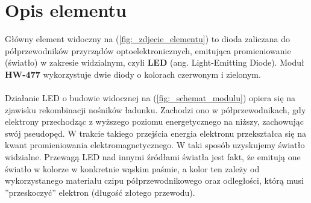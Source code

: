 \documentclass[11pt, a4paper]{article}
\author{Dawid Sobczak}
\begin{document}
%
%
\newpage

\section*{Opis elementu}
Główny element widoczny na (\ref{fig:_zdjecie_elementu}) to dioda zaliczana do półprzewodników przyrządów optoelektronicznych, emitująca promieniowanie (światło) w zakresie widzialnym, czyli \textbf{LED} (ang. Light-Emitting Diode). Moduł \textbf{HW-477} wykorzystuje dwie diody o kolorach czerwonym i zielonym.\\\\

Działanie LED o budowie widocznej na (\ref{fig:_schemat_modulu}) opiera się na zjawisku rekombinacji nośników ładunku. Zachodzi ono w półprzewodnikach, gdy elektrony przechodząc z wyższego poziomu energetycznego na niższy, zachowując swój pseudopęd. W trakcie takiego przejścia energia elektronu przekształca się na kwant promieniowania elektromagnetycznego. W taki sposób uzyskujemy światło widzialne.
Przewagą LED nad innymi źródłami światła jest fakt, że emitują one światło w kolorze w konkretnie wąskim paśmie, a kolor ten zależy od wykorzystanego materiału czipu półprzewodnikowego
oraz odległości, którą musi ”przeskoczyć” elektron (długość złotego przewodu).
\end{document}
